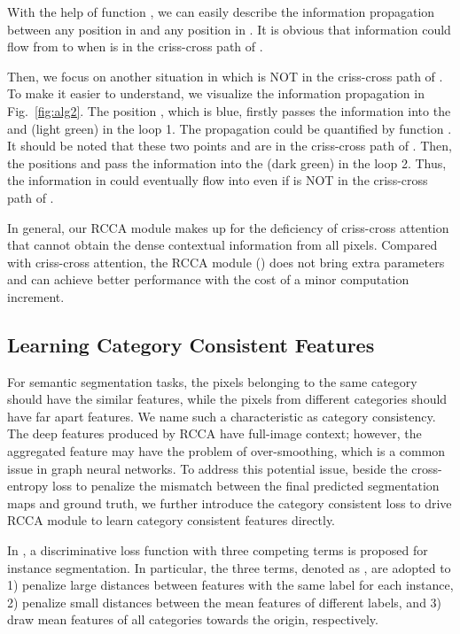 \documentclass[10pt,journal,compsoc]{IEEEtran}
\newcommand{\red}[1]{#1}
\begin{document}
\red{With the help of function , we can easily describe the information propagation between any position  in  and any position  in . It is obvious that information could flow from  to  when  is in the criss-cross path of . }

\red{Then, we focus on another situation in which  is NOT in the criss-cross path of . To make it easier to understand, we visualize the information propagation in Fig.~\ref{fig:alg2}. The position , which is blue, firstly passes the information into the  and  (light green) in the loop 1. The propagation could be quantified by function . It should be noted that 
these two points  and  are in the criss-cross path of . Then, the positions  and  pass the information into the  (dark green) in the loop 2. Thus, the information in  could eventually flow into  even if  is NOT in the criss-cross path of .}

In general, our RCCA module makes up for the deficiency of criss-cross attention that cannot obtain the dense contextual information from all pixels. Compared with criss-cross attention, the RCCA module () does not bring extra parameters and can achieve better performance with the cost of a minor computation increment. 

\subsection{Learning Category Consistent Features} 
For semantic segmentation tasks, the pixels belonging to the same category should have the similar features, while the pixels from different categories should have far apart features. We name such a characteristic as category consistency. The deep features produced by RCCA have full-image context; however, the aggregated feature may have the problem of over-smoothing, which is a common issue in graph neural networks. To address this potential issue, beside the cross-entropy loss  to penalize the mismatch between the final predicted segmentation maps and ground truth, we further introduce the category consistent loss to drive RCCA module to learn category consistent features directly.

In \cite{de2017semantic}, a discriminative loss function with three competing terms is proposed for instance segmentation. In particular, the three terms, denoted as , are adopted to 1) penalize large distances between features with the same label for each instance, 2) penalize small distances between the mean features of different labels, and 3) draw mean features of all categories towards the origin, respectively.
\end{document}
